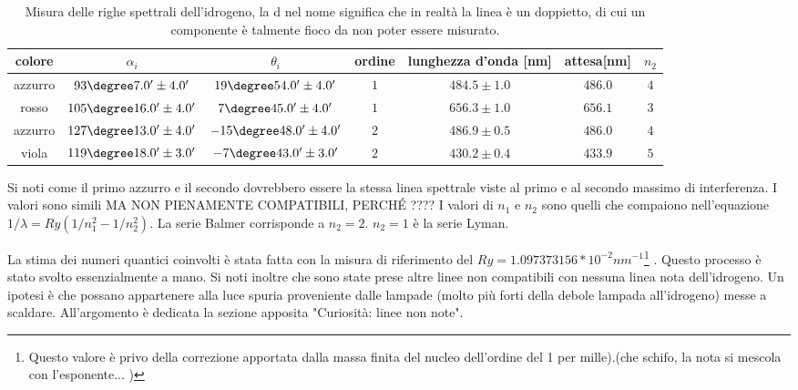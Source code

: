 \documentclass[a4paper,10pt]{article}
\begin{document}
{{{{{{{\begin{table}[H]
	\centering
	\begin{tabular}{c|c|c|c|c|c|c}
		colore & $\alpha_i$ &	$\theta_i$ & ordine & lunghezza d'onda [nm] & attesa[nm]& $n_2$  \\
		\hline
azzurro &  $ 93\degree 7.0' \pm 4.0 ' $  &  $ 19\degree 54.0' \pm 4.0 ' $  &  $ 1 $ & $ 484.5 \pm 1.0 $ & $ 486.0 $ & $ 4 $\\
rosso &  $ 105\degree 16.0' \pm 4.0 ' $  &  $ 7\degree 45.0' \pm 4.0 ' $  &  $ 1 $ & $ 656.3 \pm 1.0 $ & $ 656.1 $ & $ 3 $\\
azzurro &  $ 127\degree 13.0' \pm 4.0 ' $  &  $ -15\degree 48.0' \pm 4.0 ' $  &  $ 2 $ & $ 486.9 \pm 0.5 $ & $ 486.0 $ & $ 4 $\\
viola &  $ 119\degree 18.0' \pm 3.0 ' $  &  $ -7\degree 43.0' \pm 3.0 ' $  &  $ 2 $ & $ 430.2 \pm 0.4 $ & $ 433.9 $ & $ 5 $\\
	\end{tabular}
	\caption{Misura delle righe spettrali dell'idrogeno, la d nel nome significa che in realtà la linea è un doppietto, di cui un componente è talmente fioco da non poter essere misurato. }
	\label{tab:HH}
\end{table}



Si noti come il primo azzurro e il secondo dovrebbero essere la stessa linea spettrale viste al primo e al secondo massimo di interferenza. I valori sono simili MA NON PIENAMENTE COMPATIBILI, PERCH\'E ????
I valori di $n_1$ e $n_2$ sono quelli che compaiono nell'equazione $1/\lambda=Ry(1/n_1^2-1/n_2^2)$. La serie Balmer corrisponde a $n_2=2$. $n_2=1$ è la serie Lyman.	


La stima dei numeri quantici coinvolti è stata fatta con la misura di riferimento del $Ry=1.097373156 * 10^{-2} nm^{-1}$\footnote{ Questo valore è privo della correzione apportata dalla massa finita del nucleo dell'ordine del 1 per mille).(che schifo, la nota si mescola con l'esponente... )} . Questo processo è stato svolto essenzialmente a mano.
Si noti inoltre che sono state prese altre linee non compatibili con nessuna linea nota dell'idrogeno. Un ipotesi è che possano appartenere alla luce spuria proveniente dalle lampade (molto più forti della debole lampada all'idrogeno) messe a scaldare. All'argomento è dedicata la sezione apposita "Curiosità: linee non note".


}}}}}}}
\end{document}

